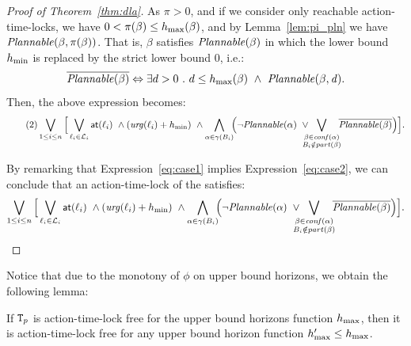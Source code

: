 \begin{proof}[Proof of Theorem~\ref{thm:dla}]
As $\pi > 0$, and if we consider only reachable action-time-locks, we have $0 < \pi(\beta) \leq
h_{\max}(\beta)$, and by Lemma~\ref{lem:pi_pln} we have $\mathit{Plannable(\beta,\pi(\beta))}$.
That is, $\beta$ satisfies  $\mathit{Plannable(\beta)}$ in which the lower bound $h_{\min}$ is replaced by the
strict lower bound 0, i.e.:
\begin{displaymath}
\overline{\plntxt{\beta}} \Leftrightarrow \exists d > 0\ . \ d \leq \hmax(\beta) \ 
  \wedge \ \plnIntxt{\beta}{d}.
\end{displaymath}
Then, the above expression becomes:
\begin{equation}
  \label{eq:case2}\tag{2}
  \bigvee_{1\le i\le n}\Big[\bigvee_{\loc_i \in \Loc_i}\al{\loc_i}\ \wedge(\urg(\loc_i)+\hmin) \
  \wedge\bigwedge_{\alpha \in \gamma(B_i)}\hspace*{-1ex}\Big(  \neg\plntxt{\alpha} \
  \vee\hspace*{-2ex}\bigvee_{\substack{\beta\in\confl(\alpha)\\B_i\notin\p{\beta}}}\hspace*{-1ex}
  \overline{\plntxt{\beta}} \Big)\Big].
\end{equation}

By remarking that Expression~\ref{eq:case1} implies Expression~\ref{eq:case2}, 
we can conclude that an action-time-lock of the \lps satisfies:
\begin{displaymath}
  \bigvee_{1\le i\le n}\Big[\bigvee_{\loc_i \in \Loc_i}\al{\loc_i}\ \wedge(\urg(\loc_i)+\hmin) \ 
  \wedge\bigwedge_{\alpha \in \gamma(B_i)}\hspace*{-1ex}\Big(  \neg\plntxt{\alpha} \
  \vee\hspace*{-2ex}\bigvee_{\substack{\beta\in\confl(\alpha)\\B_i\notin\p{\beta}}}\hspace*{-1ex}
  \overline{\plntxt{\beta}} \Big)\Big].
\end{displaymath}
\end{proof}

Notice that due to the monotony of $\phi$ on upper bound horizons, we obtain the following lemma:

\begin{lemma}\label{lemma:mon}
  If $\texttt{T}_p$ is action-time-lock free for the upper bound horizons function $h_{\max}$, 
  then it is action-time-lock free for any upper bound horizon function $h_{\max}'\le h_{\max}$.
\end{lemma}

